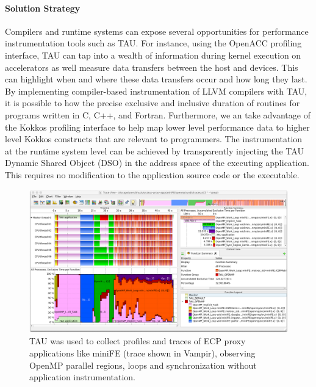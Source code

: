 \paragraph{Solution Strategy} Compilers and runtime systems can expose several opportunities for performance instrumentation tools such as TAU.  For instance, using the OpenACC profiling interface, TAU can tap into a wealth of information during kernel execution on accelerators as well measure data transfers between the host and devices. This can highlight when and where these data transfers occur and how long they last.  By implementing compiler-based instrumentation of LLVM compilers with TAU, it is possible to how the precise exclusive and inclusive duration of routines for programs written in C, C++, and Fortran.  Furthermore, we an take advantage of the Kokkos profiling interface to help map lower level performance data to higher level Kokkos constructs that are relevant to programmers. The instrumentation at the runtime system level can be achieved by transparently injecting the TAU Dynamic Shared Object (DSO) in the address space of the executing application. This requires no modification to the application source code or the executable. 

\begin{figure}[htb]
\centering
\includegraphics[width=6in]{projects/2.3.2-Tools/2.3.2.10-PROTEAS-YTUNE/miniFE_openmp_tau.png}
\caption{TAU was used to collect profiles and traces of ECP proxy applications like miniFE (trace shown in Vampir), observing OpenMP parallel regions, loops and synchronization without application instrumentation.}
\label{figure:tau:openmp}
\end{figure}

